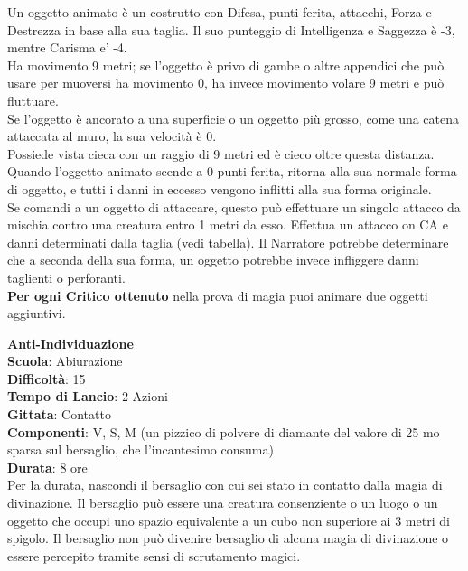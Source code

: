 \bigskip

\begin{multicols}{2}

Un oggetto animato è un costrutto con Difesa, punti ferita, attacchi, Forza e Destrezza in base alla sua taglia. Il suo punteggio di Intelligenza e Saggezza è -3, mentre Carisma e' -4.\\
Ha movimento 9 metri; se l’oggetto è privo di gambe o altre appendici che può usare per muoversi ha movimento 0, ha invece movimento volare 9 metri e può fluttuare. 
\\Se l’oggetto è ancorato a una superficie o un oggetto più grosso, come una catena attaccata al muro, la sua velocità è 0.\\
Possiede vista cieca con un raggio di 9 metri ed è cieco oltre questa distanza.\\
Quando l’oggetto animato scende a 0 punti ferita, ritorna alla sua normale forma di oggetto, e tutti i danni in eccesso vengono inflitti alla sua forma originale.\\
Se comandi a un oggetto di attaccare, questo può effettuare un singolo attacco da mischia contro una creatura entro 1 metri da esso. Effettua un attacco on CA e danni determinati dalla taglia (vedi tabella). Il Narratore potrebbe determinare che a seconda della sua forma, un oggetto potrebbe invece infliggere danni taglienti o perforanti.\\
\textbf{Per ogni Critico ottenuto} nella prova di magia puoi animare due oggetti aggiuntivi.

\medskip\textbf{Anti-Individuazione}\\
\textbf{Scuola}: Abiurazione\\
\textbf{Difficoltà}:  15\\
\textbf{Tempo di Lancio}: 2 Azioni\\
\textbf{Gittata}: Contatto\\
\textbf{Componenti}: V, S, M (un pizzico di polvere di diamante del valore di 25 mo sparsa sul bersaglio, che l'incantesimo consuma)\\
\textbf{Durata}: 8 ore\\
Per la durata, nascondi il bersaglio con cui sei stato in contatto dalla magia di divinazione. Il bersaglio può essere una creatura consenziente o un luogo o un oggetto che occupi uno spazio equivalente a un cubo non superiore ai 3 metri di spigolo. Il bersaglio non può divenire bersaglio di alcuna magia di divinazione o essere percepito tramite sensi di scrutamento magici.


\end{multicols}
